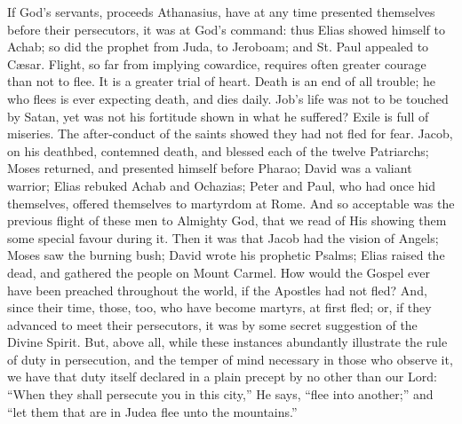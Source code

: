 If God's servants, proceeds Athanasius, have at any time presented
themselves before their persecutors, it was at God's command: thus
Elias showed himself to Achab; so did the prophet from Juda, to
Jeroboam; and St. Paul appealed to Cæsar. Flight, so far from
implying cowardice, requires often greater courage than not to flee.
It is a greater trial of heart. Death is an end of all trouble; he who
flees is ever expecting death, and dies daily. Job's life was not to
be touched by Satan, yet was not his fortitude shown in what he
suffered? Exile is full of miseries. The after-conduct of the saints
showed they had not fled for fear. Jacob, on his deathbed, contemned
death, and blessed each of the twelve Patriarchs; Moses returned, and
presented himself before Pharao; David was a valiant warrior; Elias
rebuked Achab and Ochazias; Peter and Paul, who had once hid
themselves, offered themselves to martyrdom at Rome. And so acceptable
was the previous flight of these men to Almighty God, that we read of
His showing them some special favour during it. Then it was that Jacob
had the vision of Angels; Moses saw the burning bush; David wrote his
prophetic Psalms; Elias raised the dead, and gathered the people on
Mount Carmel. How would the Gospel ever have been preached throughout
the world, if the Apostles had not fled? And, since their time, those,
too, who have become martyrs, at first fled; or, if they advanced to
meet their persecutors, it was by some secret suggestion of the Divine
Spirit. But, above all, while these instances abundantly illustrate
the rule of duty in persecution, and the temper of mind necessary in
those who observe it, we have that duty itself declared in a plain
precept by no other than our Lord: ``When they shall
persecute you in this city,'' He says, ``flee into
another;'' and ``let them that are in Judea flee unto the
mountains.''

